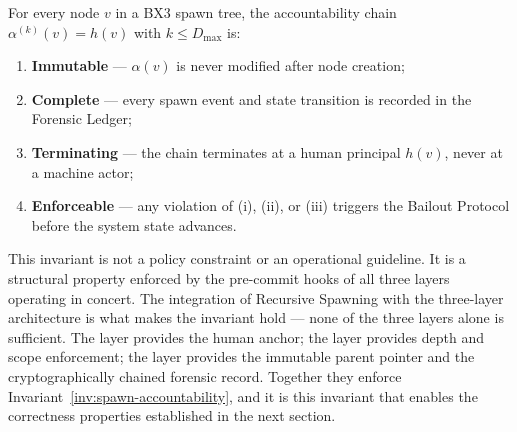 \begin{invariant}
\label{inv:spawn-accountability}
For every node $v$ in a BX3 spawn tree, the accountability chain
$\alpha^{(k)}(v) = h(v)$ with $k \leq D_{\max}$ is:
\begin{enumerate}
  \item[(i)] \textbf{Immutable} — $\alpha(v)$ is never modified after node
    creation;
  \item[(ii)] \textbf{Complete} — every spawn event and state transition is
    recorded in the Forensic Ledger;
  \item[(iii)] \textbf{Terminating} — the chain terminates at a human
    principal $h(v)$, never at a machine actor;
  \item[(iv)] \textbf{Enforceable} — any violation of (i), (ii), or (iii)
    triggers the Bailout Protocol before the system state advances.
\end{enumerate}
\end{invariant}

This invariant is not a policy constraint or an operational guideline.  It is
a structural property enforced by the pre-commit hooks of all three layers
operating in concert.  The integration of Recursive Spawning with the three-layer
architecture is what makes the invariant hold — none of the three layers alone
is sufficient.  The \Purpose{} layer provides the human anchor; the \Bounds{}
layer provides depth and scope enforcement; the \Fact{} layer provides the
immutable parent pointer and the cryptographically chained forensic record.
Together they enforce Invariant~\ref{inv:spawn-accountability}, and it is this
invariant that enables the correctness properties established in the next
section.